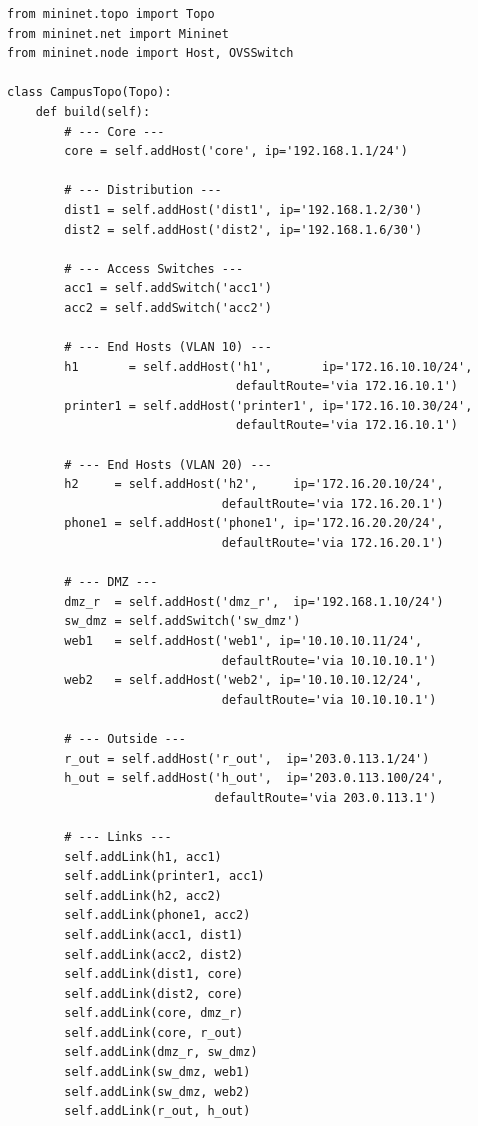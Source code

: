 \begin{lstlisting}
from mininet.topo import Topo
from mininet.net import Mininet
from mininet.node import Host, OVSSwitch

class CampusTopo(Topo):
    def build(self):
        # --- Core ---
        core = self.addHost('core', ip='192.168.1.1/24')

        # --- Distribution ---
        dist1 = self.addHost('dist1', ip='192.168.1.2/30')
        dist2 = self.addHost('dist2', ip='192.168.1.6/30')

        # --- Access Switches ---
        acc1 = self.addSwitch('acc1')
        acc2 = self.addSwitch('acc2')

        # --- End Hosts (VLAN 10) ---
        h1       = self.addHost('h1',       ip='172.16.10.10/24',
                                defaultRoute='via 172.16.10.1')
        printer1 = self.addHost('printer1', ip='172.16.10.30/24',
                                defaultRoute='via 172.16.10.1')

        # --- End Hosts (VLAN 20) ---
        h2     = self.addHost('h2',     ip='172.16.20.10/24',
                              defaultRoute='via 172.16.20.1')
        phone1 = self.addHost('phone1', ip='172.16.20.20/24',
                              defaultRoute='via 172.16.20.1')

        # --- DMZ ---
        dmz_r  = self.addHost('dmz_r',  ip='192.168.1.10/24')
        sw_dmz = self.addSwitch('sw_dmz')
        web1   = self.addHost('web1', ip='10.10.10.11/24',
                              defaultRoute='via 10.10.10.1')
        web2   = self.addHost('web2', ip='10.10.10.12/24',
                              defaultRoute='via 10.10.10.1')

        # --- Outside ---
        r_out = self.addHost('r_out',  ip='203.0.113.1/24')
        h_out = self.addHost('h_out',  ip='203.0.113.100/24',
                             defaultRoute='via 203.0.113.1')

        # --- Links ---
        self.addLink(h1, acc1)
        self.addLink(printer1, acc1)
        self.addLink(h2, acc2)
        self.addLink(phone1, acc2)
        self.addLink(acc1, dist1)
        self.addLink(acc2, dist2)
        self.addLink(dist1, core)
        self.addLink(dist2, core)
        self.addLink(core, dmz_r)
        self.addLink(core, r_out)
        self.addLink(dmz_r, sw_dmz)
        self.addLink(sw_dmz, web1)
        self.addLink(sw_dmz, web2)
        self.addLink(r_out, h_out)
\end{lstlisting}


